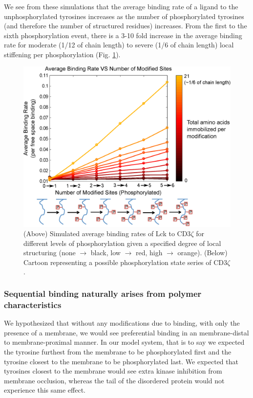 \documentclass[../../AdvancementSummary.tex]{subfiles}
\begin{document}
We see from these simulations that the average binding rate of a ligand to the unphosphorylated tyrosines increases as the number of phosphorylated tyrosines (and therefore the number of structured residues) increases. From the first to the sixth phosphorylation event, there is a 3-10 fold increase in the average binding rate for moderate (1/12 of chain length) to severe (1/6 of chain length) local stiffening per phosphorylation (Fig. \ref{fig: StiffeningMemOnCoop}).


\begin{figure}[H]
	\begin{center}
		\includegraphics[width=0.8\linewidth]{ResultsFigures/CD3ZetaStiffeningMembraneOn/AvgBindVSTotalPhosColorMapLabeled.eps}
		\caption{(Above) Simulated average binding rates of Lck to CD3$\zeta$ for different levels of phosphorylation given a specified degree of local structuring (none $\rightarrow$ black, low $\rightarrow$ red, high $\rightarrow$ orange). (Below) Cartoon representing a possible phosphorylation state series of CD3$\zeta$. \label{fig: StiffeningMemOnCoop}}
	\end{center}
\end{figure}


\subsubsection{Sequential binding naturally arises from polymer characteristics}

We hypothesized that without any modifications due to binding, with only the presence of a membrane, we would see preferential binding in an membrane-distal to membrane-proximal manner. In our model system, that is to say we expected the tyrosine furthest from the membrane to be phosphorylated first and the tyrosine closest to the membrane to be phosphorylated last. We expected that tyrosines closest to the membrane would see extra kinase inhibition from membrane occlusion, whereas the tail of the disordered protein would not experience this same effect. 
\end{document}
